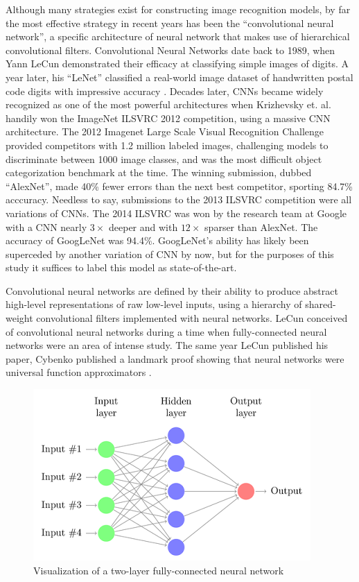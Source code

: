 \documentclass[midd]{thesis}
\begin{document}
Although many strategies exist for constructing image recognition models, by far the most effective strategy in recent years has been the ``convolutional neural network'', a specific architecture of neural network that makes use of hierarchical convolutional filters. Convolutional Neural Networks date back to 1989, when Yann LeCun demonstrated their efficacy at classifying simple images of digits\cite{lecun1989generalization}. A year later, his ``LeNet'' classified a real-world image dataset of handwritten postal code digits with impressive accuracy \cite{Cun90handwrittendigit}. Decades later, CNNs became widely recognized as one of the most powerful architectures when Krizhevsky et. al. \cite{NIPS2012_4824} handily won the ImageNet ILSVRC 2012 competition, using a massive CNN architecture. The 2012 Imagenet Large Scale Visual Recognition Challenge provided competitors with 1.2 million labeled images, challenging models to discriminate between 1000 image classes, and was the most difficult object categorization benchmark at the time. The winning submission, dubbed ``AlexNet'', made 40\% fewer errors than the next best competitor, sporting 84.7\% acccuracy. Needless to say, submissions to the 2013 ILSVRC competition were all variations of CNNs. The 2014 ILSVRC was won by the research team at Google with a CNN nearly $3\times$ deeper and with $12\times$ sparser than AlexNet. The accuracy of GoogLeNet was 94.4\%. GoogLeNet's ability has likely been superceded by another variation of CNN by now, but for the purposes of this study it suffices to label this model as state-of-the-art.

Convolutional neural networks are defined by their ability to produce abstract high-level representations of raw low-level inputs, using a hierarchy of shared-weight convolutional filters implemented with neural networks. LeCun conceived of convolutional neural networks during a time when fully-connected neural networks were an area of intense study. The same year LeCun published his paper, Cybenko published a landmark proof showing that neural networks were universal function approximators \cite{cybenko1989approximation}. 

\begin{figure}[h]
\centering
\includegraphics[width=\textwidth]{visualizations/nn.png}
\caption{Visualization of a two-layer fully-connected neural network}
\label{fig:nn}
\end{figure}
\end{document}
